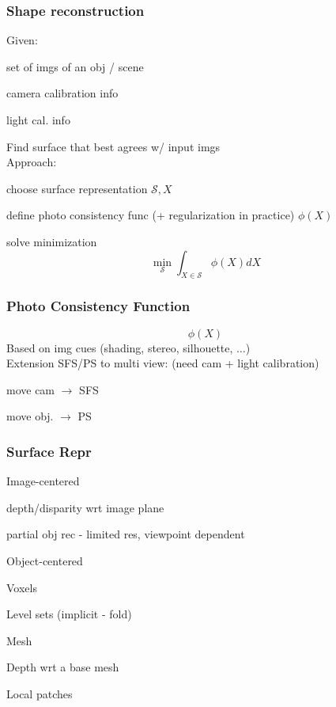 \documentclass{article}
\begin{document}
\subsubsection{Shape reconstruction}
Given:
\begin{list}{}{}
  \item set of imgs of an obj / scene
  \item camera calibration info
  \item light cal. info
\end{list}
Find surface that best agrees w/ input imgs
\\
Approach:
\begin{list}{}{}
  \item choose surface representation $\mathcal S, X$
  \item define photo consistency func (+ regularization in practice) $\phi (X)$
  \item solve minimization
  \[
    \min_\mathcal S \int_{X\in\mathcal S} \phi(X)dX
  \]
\end{list}

\subsubsection{Photo Consistency Function}
\[
  \phi (X)
\]
Based on img cues (shading, stereo, silhouette, $\ldots$)
\\
Extension SFS/PS to multi view: (need cam + light calibration)
\begin{list}{}{}
  \item move cam $\to$ SFS
  \item move obj. $\to$ PS
\end{list}

\subsubsection{Surface Repr}
Image-centered
\begin{list}{}{}
  \item depth/disparity wrt image plane
  \item partial obj rec - limited res, viewpoint dependent
\end{list}
Object-centered
\begin{list}{}{}
  \item Voxels
  \item Level sets (implicit - fold)
  \item Mesh
  \item Depth wrt a base mesh
  \item Local patches
\end{list}
\end{document}
